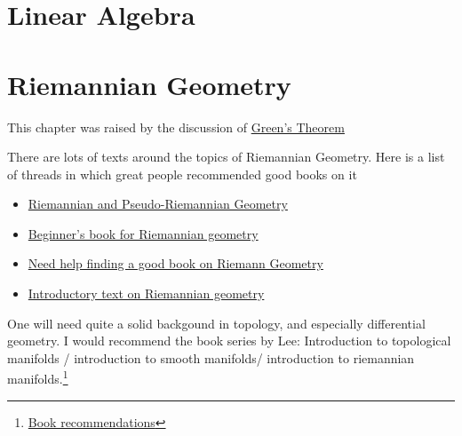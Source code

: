 
    
    \chapter{Linear Algebra}
    
    \chapter{Riemannian Geometry}
    \label{ch:riemannian-geometry}
    This chapter was raised by the discussion of \hyperlink{green-theorem-proof}{Green's Theorem}

    There are lots of texts around the topics of Riemannian Geometry. Here is a list of threads in which great people
    recommended good books on it

    \begin{itemize}
        \item \href{https://physics.stackexchange.com/a/247415}{Riemannian and Pseudo-Riemannian Geometry}
        \item \href{https://math.stackexchange.com/questions/1546037/beginners-book-for-riemannian-geometry}{Beginner's book for Riemannian geometry}
        \item \href{https://math.stackexchange.com/questions/499945/need-help-finding-a-good-book-on-riemann-geometry}{Need help finding a good book on Riemann Geometry}
        \item \href{https://mathoverflow.net/questions/19505/introductory-text-on-riemannian-geometry}{Introductory text on Riemannian geometry}
    \end{itemize}

    One will need quite a solid backgound in topology, and especially differential geometry. I would recommend the book
    series by Lee: Introduction to topological manifolds / introduction to smooth manifolds/ introduction to riemannian
    manifolds.\footnote{\href{https://www.reddit.com/r/math/comments/tt2klk/comment/i2v4nud/?utm\_source=share\&utm\_medium=web3x\&utm\_name=web3xcss\&utm\_term=1\&utm\_content=share\_button}{Book recommendations}}

